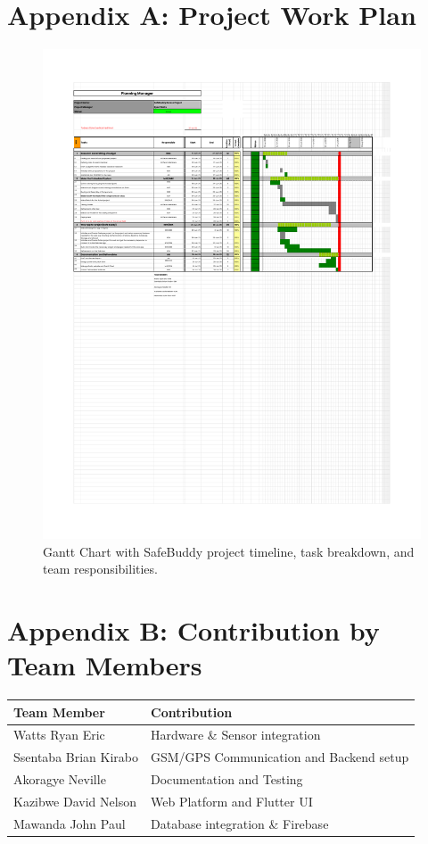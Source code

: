 \documentclass[12pt]{article}
\begin{document}
\section*{Appendix A: Project Work Plan}

\begin{figure}[H]
  \centering
  \includegraphics[width=\textwidth]{Gantt_Chart.pdf}
  \caption{Gantt Chart with SafeBuddy project timeline, task breakdown, and team responsibilities.}
  \label{fig:gantt}
\end{figure}

\section*{Appendix B: Contribution by Team Members}
\begin{longtable}{@{}ll@{}}
\toprule
\textbf{Team Member} & \textbf{Contribution} \\
\midrule
Watts Ryan Eric & Hardware \& Sensor integration \\
Ssentaba Brian Kirabo & GSM/GPS Communication and Backend setup \\
Akoragye Neville & Documentation and Testing \\
Kazibwe David Nelson & Web Platform and Flutter UI \\
Mawanda John Paul & Database integration \& Firebase \\
\bottomrule
\end{longtable}
\end{document}
